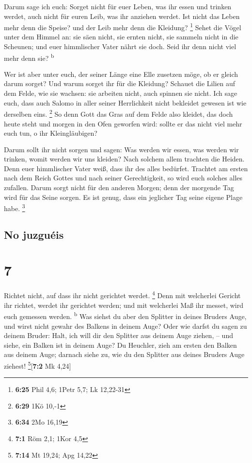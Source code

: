  Darum sage ich euch: Sorget nicht für euer Leben, was
ihr essen und trinken werdet, auch nicht für euren Leib, was ihr
anziehen werdet. Ist nicht das Leben mehr denn die Speise? und der Leib
mehr denn die Kleidung? \footnote{\textbf{6:25} Phil 4,6; 1Petr 5,7; Lk
  12,22-31}  Sehet die Vögel unter dem Himmel an: sie
säen nicht, sie ernten nicht, sie sammeln nicht in die Scheunen; und
euer himmlischer Vater nährt sie doch. Seid ihr denn nicht viel mehr
denn sie? \textsuperscript{b}

 Wer ist aber unter euch, der seiner Länge eine Elle
zusetzen möge, ob er gleich darum sorget?  Und warum
sorget ihr für die Kleidung? Schauet die Lilien auf dem Felde, wie sie
wachsen: sie arbeiten nicht, auch spinnen sie nicht.  Ich
sage euch, dass auch Salomo in aller seiner Herrlichkeit nicht bekleidet
gewesen ist wie derselben eins. \footnote{\textbf{6:29} 1Kö 10,-1}
 So denn Gott das Gras auf dem Felde also kleidet, das
doch heute steht und morgen in den Ofen geworfen wird: sollte er das
nicht viel mehr euch tun, o ihr Kleingläubigen?

 Darum sollt ihr nicht sorgen und sagen: Was werden wir
essen, was werden wir trinken, womit werden wir uns kleiden?
 Nach solchem allem trachten die Heiden. Denn euer
himmlischer Vater weiß, dass ihr des alles bedürfet. 
Trachtet am ersten nach dem Reich Gottes und nach seiner Gerechtigkeit,
so wird euch solches alles zufallen.  Darum sorgt nicht
für den anderen Morgen; denn der morgende Tag wird für das Seine sorgen.
Es ist genug, dass ein jeglicher Tag seine eigene Plage habe.
\footnote{\textbf{6:34} 2Mo 16,19}

\hypertarget{no-juzguuxe9is}{%
\subsection{No juzguéis}\label{no-juzguuxe9is}}

\hypertarget{section-6}{%
\section{7}\label{section-6}}

 Richtet nicht, auf dass ihr nicht gerichtet werdet.
\footnote{\textbf{7:1} Röm 2,1; 1Kor 4,5}  Denn mit
welcherlei Gericht ihr richtet, werdet ihr gerichtet werden; und mit
welcherlei Maß ihr messet, wird euch gemessen werden.
\textsuperscript{b}  Was siehst du aber den Splitter in
deines Bruders Auge, und wirst nicht gewahr des Balkens in deinem Auge?
 Oder wie darfst du sagen zu deinem Bruder: Halt, ich will
dir den Splitter aus deinem Auge ziehen, -- und siehe, ein Balken ist in
deinem Auge?  Du Heuchler, zieh am ersten den Balken aus
deinem Auge; darnach siehe zu, wie du den Splitter aus deines Bruders
Auge ziehest! \footnote{\textbf{7:14} Mt 19,24; Apg 14,22}{[}\textbf{7:2}
Mk 4,24{]}

